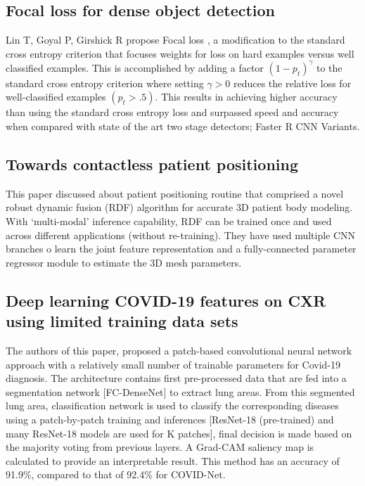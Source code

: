 \documentclass{sigkddExp}
\begin{document}
\subsection{Focal loss for dense object detection}

Lin T, Goyal P, Girshick R propose Focal loss \cite{lin2018focal}, a
modification to the standard cross entropy criterion that focuses weights for
loss on hard examples versus well classified examples. This is accomplished by
adding a factor $(1 - p_t)^\gamma$ to the standard cross entropy criterion where
setting $\gamma  > 0$ reduces the relative loss for well-classified examples
$(p_t > .5)$. This results in achieving higher accuracy than using the standard
cross entropy loss and surpassed speed and accuracy when compared with state of
the art two stage detectors; Faster R CNN Variants.


\subsection{Towards contactless patient positioning}

This paper \cite{9084097} discussed about patient positioning routine that
comprised a novel robust dynamic fusion (RDF) algorithm for accurate 3D patient
body modeling. With ‘multi-modal’ inference capability, RDF can be trained once
and used across different applications (without re-training). They have used
multiple CNN branches o learn the joint feature representation and a
fully-connected parameter regressor module to estimate the 3D mesh parameters.


\subsection{Deep learning COVID-19 features on CXR using limited training data sets}

The authors of this paper\cite{pmid32396075}, proposed a patch-based
convolutional neural network approach with a relatively small number of
trainable parameters for Covid-19 diagnosis. The architecture contains first
pre-processed data that are fed into a segmentation network [FC-DenseNet] to
extract lung areas. From this segmented lung area, classification network is
used to classify the corresponding diseases using a patch-by-patch training and
inferences [ResNet-18 (pre-trained) and many ResNet-18 models are used for K
patches], final decision is made based on the majority voting from previous
layers. A Grad-CAM saliency map is calculated to provide an interpretable
result. This method has an accuracy of 91.9\%, compared to that of 92.4\% for
COVID-Net.
\end{document}
